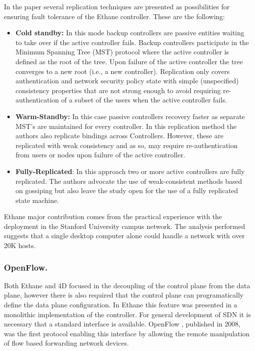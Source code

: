 In the paper several replication techniques are presented 
as possibilities for ensuring fault tolerance of the Ethane controller. These are the following: 

\begin{itemize}
\item[] \textbf{Cold standby:}  In this mode backup controllers are passive entities
  waiting to take over if  the active controller fails. Backup
  controllers participate in the
  Minimum Spanning Tree (MST) protocol where the active controller  is
  defined as the root of the tree. Upon failure of the active
  controller the tree converges to a new root (i.e., a new
  controller). Replication only covers authentication and
  network security policy state with simple (unspecified) consistency
  properties that are not strong enough to avoid requiring 
  re-authentication of a subset of  the users when the active
  controller fails. 
\item[] \textbf{Warm-Standby:} In this case  passive controllers recovery
  faster as separate  MST's are maintained for every controller. In this replication
  method the authors also replicate bindings across
  Controllers. However, 
  these are replicated with weak consistency and as so, may require
  re-authentication from users or nodes upon failure of the active controller.

\item[] \textbf{Fully-Replicated}: In this approach two or more active
  controllers are fully replicated. The authors advocate the use 
  of weak-consistent methods based on gossiping but also leave 
  the study open for the use of a fully replicated state machine.
\end{itemize}

Ethane major contribution comes from the practical  experience with
the deployment in the Stanford
University  campus network. The  analysis performed suggests that a single
desktop computer alone could handle a network with over 20K hosts. 

\subsubsection{OpenFlow.} 
\label{section:background:of} %
Both Ethane \cite{Casado:2007kb} and 4D \cite{Greenberg:2005boa}
focused in the decoupling of the control plane from the data plane, however there is also required that the control plane can programatically define the data plane configuration. In Ethane this
feature was presented in a monolithic  implementation of the controller.
For general development of SDN  it is  necessary that a
standard interface is available. OpenFlow \cite{openflow}, published
in 2008,  was the first protocol enabling this interface by allowing
the remote manipulation of flow based forwarding network devices. 

